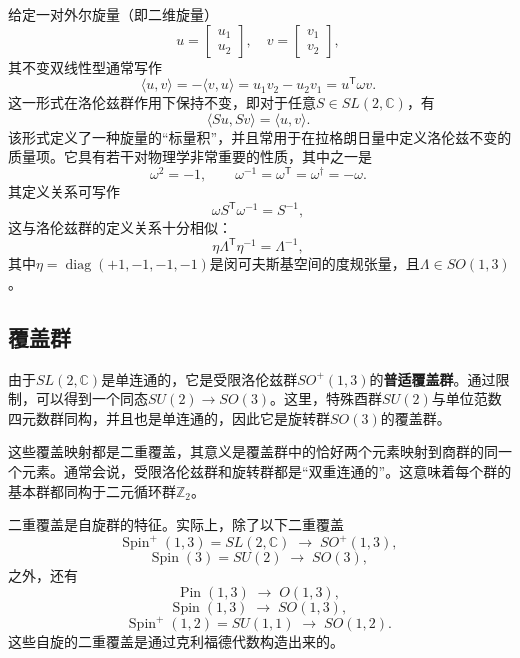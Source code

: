 给定一对外尔旋量（即二维旋量）
\[
u = 
\begin{bmatrix}
u_{1} \\
u_{2}
\end{bmatrix},
\quad
v = 
\begin{bmatrix}
v_{1} \\
v_{2}
\end{bmatrix},~
\]
其不变双线性型通常写作
\[
\langle u, v \rangle = -\langle v, u \rangle
= u_{1}v_{2} - u_{2}v_{1}
= u^{\textsf{T}} \omega v.~
\]
这一形式在洛伦兹群作用下保持不变，即对于任意$S \in SL(2,\mathbb{C})$，有
\[
\langle Su, Sv \rangle = \langle u, v \rangle.~
\]
该形式定义了一种旋量的“标量积”，并且常用于在拉格朗日量中定义洛伦兹不变的质量项。它具有若干对物理学非常重要的性质，其中之一是
\[
\omega^{2} = -1,
\qquad
\omega^{-1} = \omega^{\textsf{T}} = \omega^{\dagger} = -\omega.~
\]
其定义关系可写作
\[
\omega S^{\textsf{T}} \omega^{-1} = S^{-1},~
\]
这与洛伦兹群的定义关系十分相似：
\[
\eta \Lambda^{\textsf{T}} \eta^{-1} = \Lambda^{-1},~
\]
其中$\eta = \operatorname{diag}(+1, -1, -1, -1)$是闵可夫斯基空间的度规张量，且$\Lambda \in SO(1,3)$。
\subsection{覆盖群}
由于$SL(2,\mathbb{C})$是单连通的，它是受限洛伦兹群$SO^{+}(1,3)$的\textbf{普适覆盖群}。通过限制，可以得到一个同态$SU(2) \to SO(3)$。这里，特殊酉群$SU(2)$与单位范数四元数群同构，并且也是单连通的，因此它是旋转群$SO(3)$的覆盖群。

这些覆盖映射都是二重覆盖，其意义是覆盖群中的恰好两个元素映射到商群的同一个元素。通常会说，受限洛伦兹群和旋转群都是“双重连通的”。这意味着每个群的基本群都同构于二元循环群$\mathbb{Z}_{2}$。

二重覆盖是自旋群的特征。实际上，除了以下二重覆盖
\[
\operatorname{Spin}^{+}(1,3) = SL(2,\mathbb{C}) \;\longrightarrow\; SO^{+}(1,3),~
\]
\[
\operatorname{Spin}(3) = SU(2) \;\longrightarrow\; SO(3),~
\]
之外，还有
\[
\operatorname{Pin}(1,3) \;\longrightarrow\; O(1,3),~
\]
\[
\operatorname{Spin}(1,3) \;\longrightarrow\; SO(1,3),~
\]
\[
\operatorname{Spin}^{+}(1,2) = SU(1,1) \;\longrightarrow\; SO(1,2).~
\]
这些自旋的二重覆盖是通过克利福德代数构造出来的。

